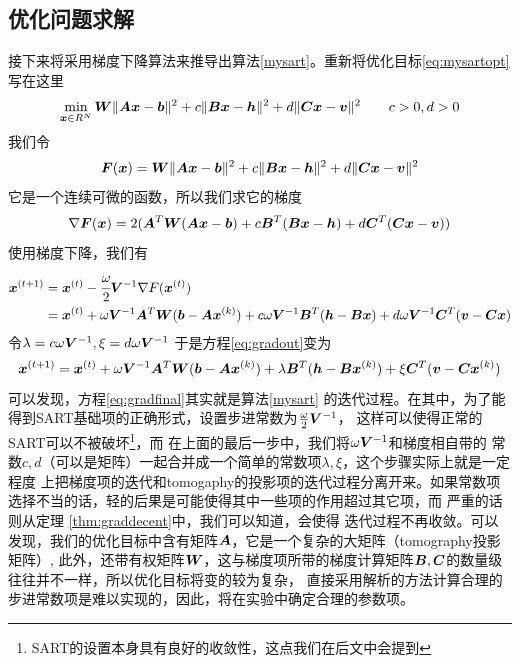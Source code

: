 \subsection{优化问题求解}
接下来将采用梯度下降算法来推导出算法\ref{mysart}。重新将优化目标\ref{eq:mysartopt}写在这里
\begin{equation}
\min_{\bm{ x}\in R^N}\bm{W}\lVert\bm{A}\bm{ x}-\bm{b}\rVert^2 +c\lVert\bm{B}\bm{ x}-\bm{h}\rVert^2+d\lVert\bm{C}\bm{ x}-\bm{v}\rVert^2 \qquad c>0,d>0
\end{equation}
我们令
\begin{equation*}
\bm{F}(\bm{ x}) = \bm{W}\lVert\bm{A}\bm{ x}-\bm{b}\rVert^2 +c\lVert\bm{B}\bm{ x}-\bm{h}\rVert^2+d\lVert\bm{C}\bm{ x}-\bm{v}\rVert^2
\end{equation*}
它是一个连续可微的函数，所以我们求它的梯度
\begin{equation*}
\nabla \bm{F}(\bm{ x}) = 2(\bm{A}^T\bm{W}(\bm{A}\bm{ x}-\bm{b})+c\bm{B}^T(\bm{B}\bm{ x}-\bm{h})+d\bm{C}^T(\bm{C}\bm{ x}-\bm{v}))
\end{equation*}
使用梯度下降，我们有
\begin{equation}\label{eq:gradout}
\begin{split}
\bm{ x}^{(t+1)}&=\bm{ x}^{(t)}-\cfrac{\omega}{2}\bm{V}^{-1}\nabla F(\bm{ x}^{(t)})\\
&=\bm{ x}^{(t)} + \omega\bm{V}^{-1}\bm{A}^T\bm{W}(\bm{b}-\bm{A}\bm{ x}^{(k)})
           + c\omega\bm{V}^{-1}\bm{B}^T(\bm{h}-\bm{B}\bm{ x})
           + d\omega\bm{V}^{-1}\bm{C}^T(\bm{v}-\bm{C}\bm{ x})
\end{split}
\end{equation}\label{eq:gradfinal}
令$\lambda = c\omega\bm{V}^{-1},\xi = d\omega\bm{V}^{-1}$
于是方程\eqref{eq:gradout}变为
\begin{equation}\label{eq:gradout2}
\bm{ x}^{(t+1)}= \bm{ x}^{(t)} + \omega\bm{V}^{-1}\bm{A}^T\bm{W}(\bm{b}-\bm{A}\bm{ x}^{(k)})
           + \lambda \bm{B}^T(\bm{h}-\bm{B}\bm{ x}^{(k)})
           + \xi \bm{C}^T(\bm{v}-\bm{C}\bm{ x}^{(k)})
\end{equation}
可以发现，方程\eqref{eq:gradfinal}其实就是算法\ref{mysart}
的迭代过程。在其中，为了能得到SART基础项的正确形式，设置步进常数为$\tfrac{\omega}{2}\bm{V}^{-1}$，
这样可以使得正常的SART可以不被破坏\footnote{SART的设置本身具有良好的收敛性，这点我们在后文中会提到}，而
在上面的最后一步中，我们将$\omega\bm{V}^{-1}$和梯度相自带的
常数$c,d$（可以是矩阵）一起合并成一个简单的常数项$\lambda ,\xi$，这个步骤实际上就是一定程度
上把梯度项的迭代和tomogaphy的投影项的迭代过程分离开来。如果常数项选择不当的话，轻的后果是可能使得其中一些项的作用超过其它项，而
严重的话则从定理
\ref{thm:graddecent}中，我们可以知道，会使得
迭代过程不再收敛。可以发现，我们的优化目标中含有矩阵$\bm{A}$，它是一个复杂的大矩阵（tomography投影矩阵）,
此外，还带有权矩阵$\bm{W}$，这与梯度项所带的梯度计算矩阵$\bm{B},\bm{C}$的数量级往往并不一样，所以优化目标将变的较为复杂，
直接采用解析的方法计算合理的步进常数项是难以实现的，因此，将在实验中确定合理的参数项。

